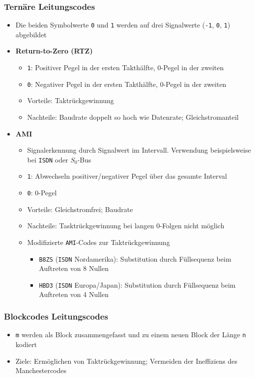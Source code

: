 \subsubsection{Ternäre Leitungscodes}
\begin{itemize}
	\item Die beiden Symbolwerte \texttt{0} und \texttt{1} werden auf drei Signalwerte (\texttt{-1}, \texttt{0}, \texttt{1}) abgebildet
	\item \textbf{Return-to-Zero (RTZ)}
	\begin{itemize}
		\item \texttt{1}: Positiver Pegel in der ersten Takthälfte, 0-Pegel in der zweiten
		\item \texttt{0}: Negativer Pegel in der ersten Takthälfte, 0-Pegel in der zweiten
		\item Vorteile: Taktrückgewinnung
		\item Nachteile: Baudrate doppelt so hoch wie Datenrate; Gleichstromanteil
	\end{itemize}
	\item \textbf{AMI}
	\begin{itemize}
		\item Signalerkennung durch Signalwert im Intervall. Verwendung beispielsweise bei \texttt{ISDN} oder \(S_0\)-Bus
		\item \texttt{1}: Abwechseln positiver/negativer Pegel über das gesamte Interval
		\item \texttt{0}: 0-Pegel
		\item Vorteile: Gleichstromfrei; Baudrate
		\item Nachteile: Tasktrückgewinnung bei langen 0-Folgen nicht möglich
		\item Modifizierte \texttt{AMI}-Codes zur Taktrückgewinnung
		\begin{itemize}
			\item \texttt{B8ZS} (\texttt{ISDN} Nordamerika): Substitution durch Füllsequenz beim Auftreten von 8 Nullen
			\item \texttt{HBD3} (\texttt{ISDN} Europa/Japan): Substitution durch Füllsequenz beim Auftreten von 4 Nullen
		\end{itemize}
	\end{itemize}
\end{itemize}

\subsubsection{Blockcodes Leitungscodes}
\begin{itemize}
	\item \texttt{m} werden als Block zusammengefasst und zu einem neuen Block der Länge \texttt{n} kodiert
	\item Ziele: Ermöglichen von Taktrückgewinnung; Vermeiden der Ineffiziens des Manchestercodes
\end{itemize}



